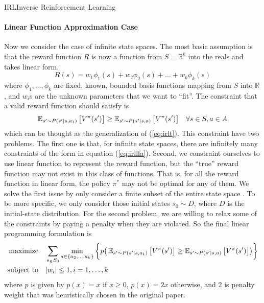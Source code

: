 \documentclass[9pt]{article}
\begin{document}
\begin{topic}{IRL}{Inverse Reinforcement Learning}
\paragraph{Linear Function Approximation Case} Now we consider the case of infinite state spaces. The most basic assumption is that the reward function $R$ is now a function from $S=\mathbb{R}^k$ into the reals and takes linear form.
\[
R(s) = w_1\phi_1(s) + w_2\phi_2(s) + \dots +w_k\phi_k(s)
\]
where $\phi_1,\ldots, \phi_k$ are fixed, known, bounded basis functions mapping from $S$ into $\mathbb{R}$, and $w_i$s are the unknown parameters that we want to ``fit''. The constraint that a valid reward function should satisfy is 
\begin{equation}
\label{eq:irllfa}
\operatorname{\mathbb{E}}_{s' \sim P(s'|s,a_1)}\big[V^{\pi}(s')\big] \ge \operatorname{\mathbb{E}}_{s' \sim P(s'|s,a)}\big[V^{\pi}(s')\big] \quad \forall s\in S, a\in A
\end{equation}
which can be thought as the generalization of (\ref{eq:irlt}). This constraint have two problems. The first one is that, for infinite state spaces, there are infinitely many constraints of the form in equation (\ref{eq:irllfa}). Second, we constraint ourselves to use linear function to represent the reward function, but the ``true'' reward function may not exist in this class of functions. That is, for all the reward function in linear form, the policy $\pi^*$ may not be optimal for any of them. We solve the first issue by only consider a finite subset of the entire state space . To be more specific, we only consider those initial states $s_0 \sim D$, where $D$ is the initial-state distribution. For the second problem, we are willing to relax some of the constraints by paying a penalty when they are violated. So the final linear programming formulation is
\[
\begin{split}
\text{maximize} & \quad \sum_{s_\in S_0} \min_{a\in \{a_2,\ldots,a_k\}}\bigg\{p\big(\operatorname{\mathbb{E}}_{s' \sim P(s'|s,a_1)}\big[V^{\pi}(s')\big] \ge \operatorname{\mathbb{E}}_{s' \sim P(s'|s,a)}\big[V^{\pi}(s')\big]\big) \bigg\}\\
\text{subject to} & \quad |w_i| \le 1, i = 1, \ldots, k
\end{split}
\]
where $p$ is given by $p(x) = x$ if $x\ge 0$, $p(x) = 2x$ otherwise, and 2 is penalty weight that was heuristically chosen in the original paper.

\end{topic}
\end{document}
